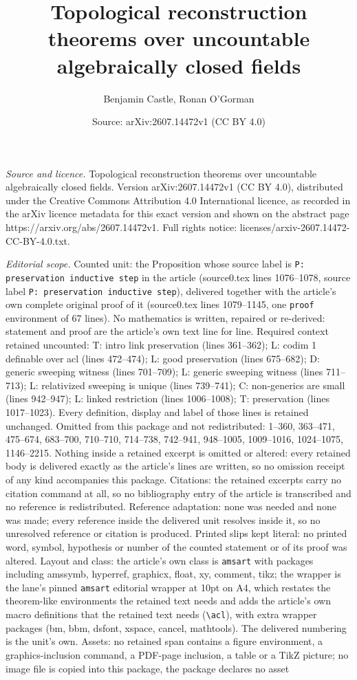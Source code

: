 \documentclass[10pt,a4paper]{amsart}
\title[Topological reconstruction theorems over uncountable algebra]{Topological reconstruction theorems over uncountable algebraically closed fields}
\author{Benjamin Castle, Ronan O'Gorman}
\date{Source: arXiv:2607.14472v1 (CC BY 4.0)}
\begin{document}
\maketitle

\noindent\emph{Source and licence.} Topological reconstruction theorems over uncountable algebraically closed fields. Version arXiv:2607.14472v1 (CC BY 4.0), distributed under the Creative Commons Attribution 4.0 International licence, as recorded in the arXiv licence metadata for this exact version and shown on the abstract page https://arxiv.org/abs/2607.14472v1. Full rights notice: licenses/arxiv-2607.14472-CC-BY-4.0.txt.\par\smallskip

\noindent\textit{Editorial scope.} Counted unit: the Proposition whose source label is \texttt{P: preservation inductive step} in the article (source0.tex lines 1076--1078, source label \texttt{P: preservation inductive step}), delivered together with the article's own complete original proof of it (source0.tex lines 1079--1145, one \texttt{proof} environment of 67 lines). No mathematics is written, repaired or re-derived: statement and proof are the article's own text line for line. Required context retained uncounted: T: intro link preservation (lines 361--362); L: codim 1 definable over acl (lines 472--474); L: good preservation (lines 675--682); D: generic sweeping witness (lines 701--709); L: generic sweeping witness (lines 711--713); L: relativized sweeping is unique (lines 739--741); C: non-generics are small (lines 942--947); L: linked restriction (lines 1006--1008); T: preservation (lines 1017--1023). Every definition, display and label of those lines is retained unchanged. Omitted from this package and not redistributed: 1--360, 363--471, 475--674, 683--700, 710--710, 714--738, 742--941, 948--1005, 1009--1016, 1024--1075, 1146--2215. Nothing inside a retained excerpt is omitted or altered: every retained body is delivered exactly as the article's lines are written, so no omission receipt of any kind accompanies this package. Citations: the retained excerpts carry no citation command at all, so no bibliography entry of the article is transcribed and no reference is redistributed. Reference adaptation: none was needed and none was made; every reference inside the delivered unit resolves inside it, so no unresolved reference or citation is produced. Printed slips kept literal: no printed word, symbol, hypothesis or number of the counted statement or of its proof was altered. Layout and class: the article's own class is \texttt{amsart} with packages including amssymb, hyperref, graphicx, float, xy, comment, tikz; the wrapper is the lane's pinned \texttt{amsart} editorial wrapper at 10pt on A4, which restates the theorem-like environments the retained text needs and adds the article's own macro definitions that the retained text needs (\texttt{\textbackslash acl}), with extra wrapper packages (bm, bbm, dsfont, xspace, cancel, mathtools). The delivered numbering is the unit's own. Assets: no retained span contains a figure environment, a graphics-inclusion command, a PDF-page inclusion, a table or a TikZ picture; no image file is copied into this package, the package declares no asset 
\end{document}
